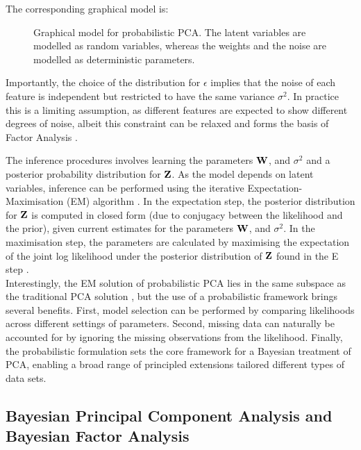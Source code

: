 The corresponding graphical model is:

\begin{figure}[H]
	\centering
	
	\caption{Graphical model for probabilistic PCA. The latent variables are modelled as random variables, whereas the weights and the noise are modelled as deterministic parameters.}
	\label{fig:pPCA}
\end{figure}

Importantly, the choice of the distribution for $\epsilon$ implies that the noise of each feature is independent but restricted to have the same variance $\sigma^2$. In practice this is a limiting assumption, as different features are expected to show different degrees of noise, albeit this constraint can be relaxed and forms the basis of Factor Analysis \cite{Rubin1982,Bishop2006}.

The inference procedures involves learning the parameters ${\bf W}$, and $\sigma^2$ and a posterior probability distribution for ${\bf Z}$. As the model depends on latent variables, inference can be performed using the iterative Expectation-Maximisation (EM) algorithm \cite{Rubin1982,Bishop2006}. In the expectation step, the posterior distribution for ${\bf Z}$ is computed in closed form (due to conjugacy between the likelihood and the prior), given current estimates for the parameters ${\bf W}$, and $\sigma^2$. In the maximisation step, the parameters are calculated by maximising the expectation of the joint log likelihood under the posterior distribution of ${\bf Z}$ found in the E step \cite{Tipping1999}.\\
Interestingly, the EM solution of probabilistic PCA lies in the same subspace as the traditional PCA solution \cite{Tipping1999}, but the use of a probabilistic framework brings several benefits. First, model selection can be performed by comparing likelihoods across different settings of parameters. Second, missing data can naturally be accounted for by ignoring the missing observations from the likelihood. Finally, the probabilistic formulation sets the core framework for a Bayesian treatment of PCA, enabling a broad range of principled extensions tailored different types of data sets.


\subsection{Bayesian Principal Component Analysis and Bayesian Factor Analysis} \label{section:bayesian_pca}

